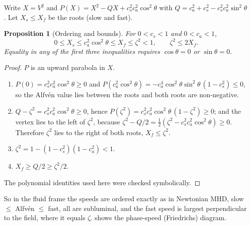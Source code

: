 \documentclass[11pt,a4paper,oneside,openany]{book}
\theoremstyle{definition}
\theoremstyle{plain}
\newtheorem{proposition}{Proposition}[chapter]
\theoremstyle{remark}
\begin{document}
Write $X=V^2$ and $P(X)=X^2-QX+c_s^2c_a^2\cos^2\theta$ with
$Q=c_a^2+c_s^2-c_s^2c_a^2\sin^2\theta$. Let $X_s\le X_f$ be the roots (slow and fast).

\begin{proposition}[Ordering and bounds]\label{prop:ordering}
For $0<c_s<1$ and $0<c_a<1$,
\begin{equation}
0\le X_s\le c_a^2\cos^2\theta\le X_f\le\zeta^2<1,\qquad \zeta^2\le 2X_f .
\end{equation}
Equality in any of the first three inequalities requires $\cos\theta=0$ or
$\sin\theta=0$.
\end{proposition}

\begin{proof}
$P$ is an upward parabola in $X$.
\begin{enumerate}[label=(\roman*),nosep]
\item $P(0)=c_s^2c_a^2\cos^2\theta\ge0$ and
  $P(c_a^2\cos^2\theta)=-c_a^4\cos^2\theta\sin^2\theta\,(1-c_s^2)\le0$, so the Alfvén
  value lies between the roots and both roots are non-negative.
\item $Q-\zeta^2=c_s^2c_a^2\cos^2\theta\ge0$, hence
  $P(\zeta^2)=c_s^2c_a^2\cos^2\theta\,(1-\zeta^2)\ge0$; and the vertex lies to the left of
  $\zeta^2$, because $\zeta^2-Q/2=\tfrac12(\zeta^2-c_s^2c_a^2\cos^2\theta)\ge0$. Therefore
  $\zeta^2$ lies to the right of both roots, $X_f\le\zeta^2$.
\item $\zeta^2=1-(1-c_s^2)(1-c_a^2)<1$.
\item $X_f\ge Q/2\ge\zeta^2/2$.
\end{enumerate}
The polynomial identities used here were checked symbolically.
\end{proof}

So in the fluid frame the speeds are ordered exactly as in Newtonian MHD,
slow $\le$ Alfvén $\le$ fast, all are subluminal, and the fast speed is largest
perpendicular to the field, where it equals $\zeta$.  shows the
phase-speed (Friedrichs) diagram.
\end{document}
